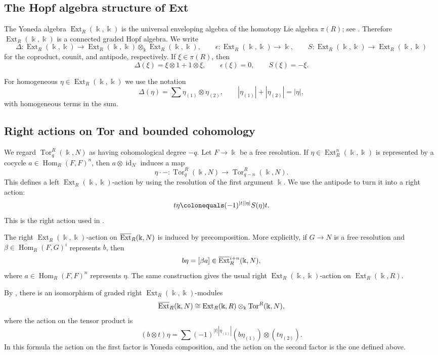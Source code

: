 \documentclass{amsart}
\theoremstyle{definition}
\theoremstyle{definition}
\theoremstyle{remark}
\numberwithin{equation}{section}
\newcommand{\kk}{\Bbbk}
\newcommand{\id}{\operatorname{id}}
\newcommand{\Ext}{\operatorname{Ext}}
\newcommand{\bExt}{\overline{\operatorname{Ext}}{\vphantom E}}
\newcommand{\Hom}{\operatorname{Hom}}
\newcommand{\bHom}{\overline{\operatorname{Hom}}}
\newcommand{\Tor}{\operatorname{Tor}}
\begin{document}
\subsection*{The Hopf algebra structure of Ext}
The Yoneda algebra $\Ext_R(\kk,\kk)$ is the
universal enveloping algebra of the homotopy Lie algebra $\pi(R)$; see
\cite[Theorem 10.2.1]{IFR}. Therefore $\Ext_R(\kk,\kk)$ is a connected graded Hopf algebra. We write
\[
\Delta:\Ext_R(\kk,\kk)\longrightarrow\Ext_R(\kk,\kk)\otimes_\kk\Ext_R(\kk,\kk),\qquad
\epsilon:\Ext_R(\kk,\kk)\longrightarrow\kk,\qquad S:\Ext_R(\kk,\kk)\longrightarrow\Ext_R(\kk,\kk)
\]
for the coproduct, counit, and antipode, respectively. If $\xi\in\pi(R)$, then
\[
\Delta(\xi)=\xi\otimes1+1\otimes\xi,\qquad
\epsilon(\xi)=0,\qquad S(\xi)=-\xi.
\]

For homogeneous $\eta\in\Ext_R(\kk,\kk)$ we use the notation
\[
\Delta(\eta)=\sum\eta_{(1)}\otimes\eta_{(2)},
\qquad |\eta_{(1)}|+|\eta_{(2)}|=|\eta|,
\]
with homogeneous terms in the sum.

\subsection*{Right actions on Tor and bounded cohomology}
We regard $\Tor_q^R(\kk,N)$ as having cohomological degree $-q$.
Let $F\rightarrow\kk$ be a free resolution. If
$\eta\in\Ext_R^n(\kk,\kk)$ is represented by a cocycle
$a\in\Hom_R(F,F)^n$, then $a\otimes\id_N$ induces a map
\[
\eta\cdot-:\Tor_q^R(\kk,N)\longrightarrow\Tor_{q-n}^R(\kk,N).
\]
This defines a left $\Ext_R(\kk,\kk)$-action by using the resolution of the first
argument $\kk$. We use the antipode to turn it into a right action:
\[
t\eta\colonequals(-1)^{|t||\eta|}S(\eta)t.
\]
This is the right action used in \cite{bimodule}.

The right $\Ext_R(\kk,\kk)$-action on $\bExt_R(\kk,N)$ is induced by
precomposition. More explicitly, if $G\rightarrow N$ is a free
resolution and $\beta\in\bHom_R(F,G)^i$ represents $b$, then
\[
b\eta=[\beta a]\in\bExt_R^{i+n}(\kk,N),
\]
where $a\in\Hom_R(F,F)^n$ represents $\eta$. The same construction
gives the usual right $\Ext_R(\kk,\kk)$-action on $\Ext_R(\kk,R)$.

By \cite[Corollary 3.5]{bimodule}, there is an isomorphism of graded
right $\Ext_R(\kk,\kk)$-modules
\[
\bExt_R(\kk,N)\cong
\Ext_R(\kk,R)\otimes_\kk\Tor^R(\kk,N),
\]
where the action on the tensor product is
\[
(b\otimes t)\eta=
\sum(-1)^{|t||\eta_{(1)}|}
(b\eta_{(1)})\otimes(t\eta_{(2)}).
\]
In this formula the action on the first factor is Yoneda composition,
and the action on the second factor is the one defined above.
\end{document}
